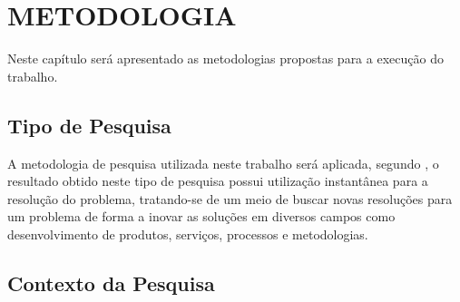 \chapter{METODOLOGIA}


%

Neste capítulo será apresentado as metodologias propostas para a execução do
trabalho.


		

\section{Tipo de Pesquisa}

\par A metodologia de pesquisa utilizada neste trabalho será aplicada, segundo
, o resultado obtido neste tipo de pesquisa
possui utilização instantânea para a resolução do problema, tratando-se de um
meio de buscar novas resoluções para um problema de forma a inovar as soluções em diversos
campos como desenvolvimento de produtos, serviços, processos e metodologias.




\section{Contexto da Pesquisa}

